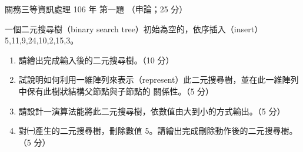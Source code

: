 \begin{pastexam}[label={px:gw3-106-ds-01}]{關務三等資訊處理 106 年 第一題}
（申論；25 分）

一個二元搜尋樹（binary search tree）初始為空的，依序插入（insert）5,11,9,24,10,2,15,3。
\begin{enumerate}[leftmargin=2.6em, labelsep=0.4em]
\item[㈠] 請繪出完成輸入後的二元搜尋樹。（10 分）
\item[㈡] 試說明如何利用一維陣列來表示（represent）此二元搜尋樹，並在此一維陣列中保有此樹狀結構父節點與子節點的
關係性。（5 分）
\item[㈢] 請設計一演算法能將此二元搜尋樹，依數值由大到小的方式輸出。（5 分）
\item[㈣] 對㈠產生的二元搜尋樹，刪除數值 5。請繪出完成刪除動作後的二元搜尋樹。（5 分）
\end{enumerate}
\end{pastexam}

